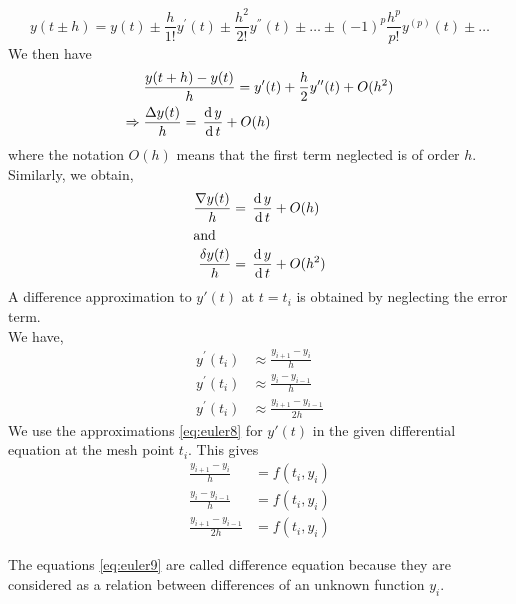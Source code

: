 \documentclass[../main-sheet.tex]{subfiles}
\begin{document}
        \begin{equation}
            y(t\pm h)=y(t)\pm \frac{h}{1!}y^{'}(t)\pm \frac{h^2}{2!}y^{''}(t)\pm \dots\pm (-1)^p \frac{h^p}{p!}y^{(p)}(t)\pm \dots \label{eq:euler4}
        \end{equation}
        We then have
        \begin{align}
            &\frac{y(t+h)-y(t)}{h}=y'(t)+\frac{h}{2}y''(t)+O(h^2)\notag\\
            \Rightarrow\;&\frac{\Delta y(t)}{h}=\,\frac{\mathrm{d}\,y}{\mathrm{d}\,t}+O(h)\label{eq:euler5}
        \end{align}
        where the notation \(O(h)\) means that the first term neglected is of order \(h\).\\
        Similarly, we obtain,
        \begin{align}
            \frac{\nabla y(t)}{h}&=\,\frac{\mathrm{d}\,y}{\mathrm{d}\,t}+O(h)\label{eq:euler6}\\
            \intertext{and}
            \frac{\delta y(t)}{h}&=\,\frac{\mathrm{d}\,y}{\mathrm{d}\,t}+O(h^2)\label{eq:euler7}
        \end{align}
        A difference approximation to \(y'(t)\) at \(t=t_i\) is obtained by neglecting the error term.\\
        We have,
        \begin{subequations}
            \begin{align}
            y^{'}(t_i) & \approx \frac{y_{i+1}-y_i}{h} \label{eq:euler8a}\\
            y^{'}(t_i) & \approx \frac{y_{i}-y_{i-1}}{h} \label{eq:euler8b}\\
            y^{'}(t_i) & \approx \frac{y_{i+1}-y_{i-1}}{2h} \label{eq:euler8c}
            \end{align}
            \label{eq:euler8}
        \end{subequations}
        We use the approximations \eqref{eq:euler8} for \(y'(t)\) in the given differential equation at the mesh point \(t_i\).
        This gives
        \begin{subequations}
            \begin{align}
            \frac{y_{i+1}-y_i}{h}&=f(t_i,y_i) \label{eq:euler9a}\\
            \frac{y_{i}-y_{i-1}}{h}&=f(t_i,y_i) \label{eq:euler9b}\\
            \frac{y_{i+1}-y_{i-1}}{2h}&=f(t_i,y_i) \label{eq:euler9c}
            \end{align}
            \label{eq:euler9}
        \end{subequations}
        \begin{note}
            The equations \eqref{eq:euler9} are called difference equation because they are considered as a relation between differences of an unknown function \(y_i\).
        \end{note}
\end{document}
